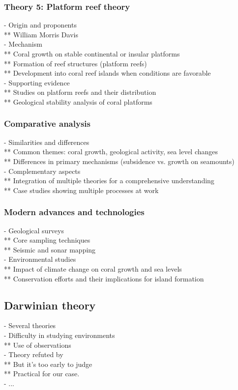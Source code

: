 \subsubsection{Theory 5: Platform reef theory}
- Origin and proponents \\
** William Morris Davis \\
- Mechanism \\
** Coral growth on stable continental or insular platforms \\
** Formation of reef structures (platform reefs) \\
** Development into coral reef islands when conditions are favorable \\
- Supporting evidence \\
** Studies on platform reefs and their distribution \\
** Geological stability analysis of coral platforms

\subsubsection{Comparative analysis}
- Similarities and differences \\
** Common themes: coral growth, geological activity, sea level changes \\
** Differences in primary mechanisms (subsidence vs. growth on seamounts) \\
- Complementary aspects \\
** Integration of multiple theories for a comprehensive understanding \\
** Case studies showing multiple processes at work 

\subsubsection{Modern advances and technologies}
- Geological surveys \\
** Core sampling techniques \\
** Seismic and sonar mapping \\
- Environmental studies \\
** Impact of climate change on coral growth and sea levels \\
** Conservation efforts and their implications for island formation

\subsection{Darwinian theory}
- Several theories \\
- Difficulty in studying environments \\
** Use of observations \\
- Theory refuted by \cite{Droxler2021} \\
** But it's too early to judge \\
** Practical for our case. \\
- ...


